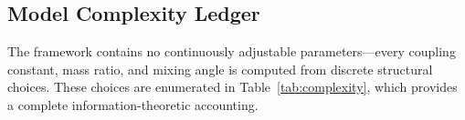 \documentclass[aps,prd,twocolumn,superscriptaddress,floatfix,nofootinbib]{revtex4-2}
\theoremstyle{definition}
\theoremstyle{remark}
\begin{document}
\begin{center}
\end{center}

\subsection{Model Complexity Ledger}
\label{sec:complexity}

The framework contains no continuously adjustable parameters---every coupling
constant, mass ratio, and mixing angle is computed from discrete structural
choices.  These choices are enumerated in Table~\ref{tab:complexity}, which
provides a complete information-theoretic accounting.
\end{document}
